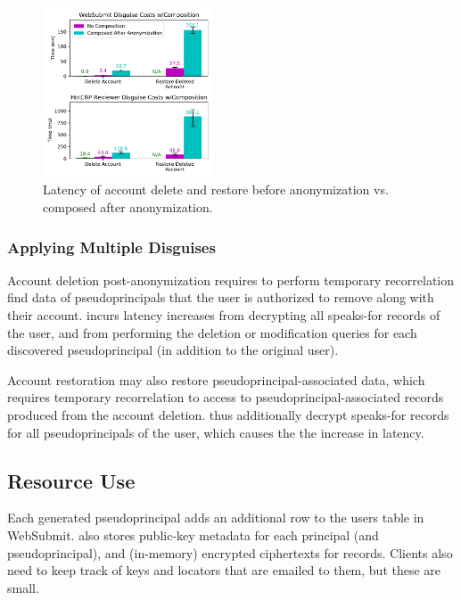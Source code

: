 \begin{figure}[t]
    \centering
    \includegraphics[width=0.45\textwidth]{figs/composition_stats}
    \caption{Latency of account delete and restore before anonymization vs. composed after anonymization.}
    \label{f:composition}
\end{figure}

\subsubsection{Applying Multiple Disguises}


Account deletion post-anonymization requires \sys to perform temporary recorrelation find data of
pseudoprincipals that the user is authorized to remove along with their account. \sys incurs latency
increases from decrypting all speaks-for records of the user, and from performing the deletion or
modification queries for each discovered pseudoprincipal (in addition to the original user).

Account restoration may also restore pseudoprincipal-associated data, which requires temporary
recorrelation to access to pseudoprincipal-associated records produced from the account deletion.
\sys thus additionally decrypt speaks-for records for all pseudoprincipals of the user, which causes
the the increase in latency.


\subsection{Resource Use}
\label{s:eval-res}


%
Each generated pseudoprincipal adds an additional row to the users table in WebSubmit.
%
\sys also stores public-key metadata for each principal (and pseudoprincipal), and
(in-memory) encrypted ciphertexts for records.
%
Clients also need to keep track of keys and locators that are emailed to them, but these
are small.
%

